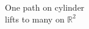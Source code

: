 \documentclass[preview]{standalone}
\begin{document}
\begin{center}
One path on cylinder\\lifts to many on $\mathbb{R}^2$
\end{center}
\end{document}
